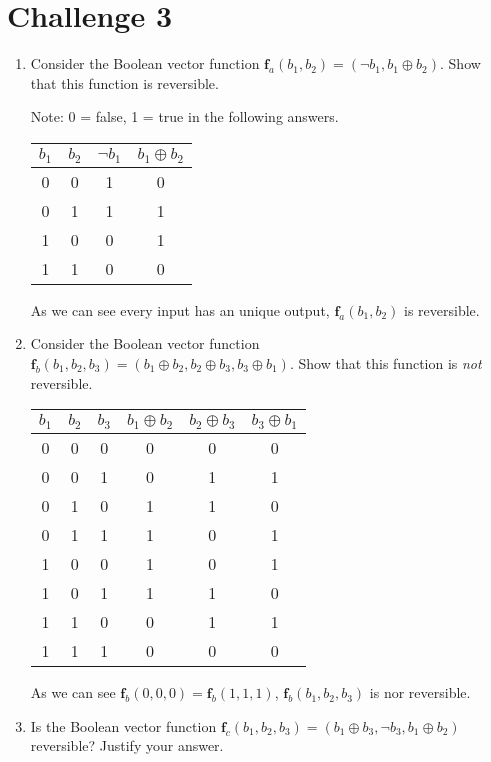 \documentclass[11pt]{article}
\begin{document}
\section*{Challenge 3}
\begin{enumerate}[label=\alph*.]
    \item Consider the Boolean vector function $\mathbf{f}_a(b_1, b_2) = (\neg b_1, b_1 \oplus b_2)$. Show that this function is reversible.
    
    Note: 0 = false, 1 = true in the following answers.
    
    \begin{tabular}{cc|cc}
         $b_1$ & $b_2$ & $\neg b_1$ & $b_1 \oplus b_2$ \\ \hline \hline
         0 & 0 & 1 & 0 \\
         0 & 1 & 1 & 1 \\
         1 & 0 & 0 & 1 \\
         1 & 1 & 0 & 0
    \end{tabular}
    
    As we can see every input has an unique output, $\mathbf{f}_a(b_1, b_2)$ is reversible.
    
    \item Consider the Boolean vector function $\mathbf{f}_b(b_1, b_2, b_3) = (b_1 \oplus b_2, b_2 \oplus b_3, b_3 \oplus b_1)$. Show that this function is \textit{not} reversible.
    
    \begin{tabular}{ccc|ccc}
         $b_1$ & $b_2$ & $b_3$ & $b_1 \oplus b_2$ & $b_2 \oplus b_3$ & $b_3 \oplus b_1$ \\ \hline \hline
         0 & 0 & 0 & 0 & 0 & 0 \\
         0 & 0 & 1 & 0 & 1 & 1 \\
         0 & 1 & 0 & 1 & 1 & 0 \\
         0 & 1 & 1 & 1 & 0 & 1 \\
         1 & 0 & 0 & 1 & 0 & 1 \\
         1 & 0 & 1 & 1 & 1 & 0 \\
         1 & 1 & 0 & 0 & 1 & 1 \\
         1 & 1 & 1 & 0 & 0 & 0 \\
    \end{tabular}
    
    As we can see $\mathbf{f}_b(0, 0, 0) = \mathbf{f}_b(1, 1, 1)$,  $\mathbf{f}_b(b_1, b_2, b_3)$ is nor reversible.
    
    \item Is the Boolean vector function $\mathbf{f}_c(b_1, b_2, b_3) = (b_1 \oplus b_3, \neg b_3, b_1 \oplus b_2)$ reversible? Justify your answer.
    

\end{enumerate}
\end{document}
